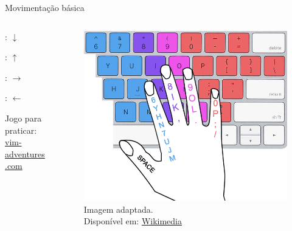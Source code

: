 \begin{frame}{Movimentação básica}
    \begin{columns}
        \begin{column}{0.4\textwidth}
            \begin{widedescription}
                \item {}: $\downarrow$
                \item {}: $\uparrow$
                \item {}: $\rightarrow$
                \item {}: $\leftarrow$
                \item Jogo para praticar: \\ \hyperlink{https://vim-adventures.com/}{vim-adventures.com}
            \end{widedescription}
        \end{column}
        
        \begin{column}{0.6\textwidth}
            \begin{figure}
                \includegraphics[width=\linewidth]{Image/Finger_position_on_a_keyboard-only-right-hand.png}
                \label{right-hand} 
                \footnotesize
                \\ Imagem adaptada. \\
                Disponível em:  \hyperlink{https://commons.wikimedia.org/wiki/File:Finger_position_on_a_keyboard.png}{Wikimedia}
            \end{figure}
        \end{column}
    \end{columns}

    \begin{flushleft}
    \end{flushleft}
\end{frame}

